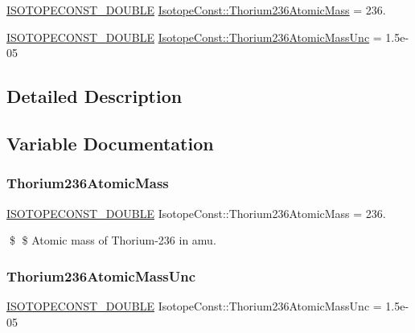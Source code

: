 \begin{DoxyCompactItemize}
\item 
\mbox{\hyperlink{group___isotope_const-_macros_ga8f45a7272ce02c0b4c65c44636ed719a}{I\+S\+O\+T\+O\+P\+E\+C\+O\+N\+S\+T\+\_\+\+D\+O\+U\+B\+LE}} \mbox{\hyperlink{group___isotope_const-_thorium-_th236_ga686ee07c3951e1dc96004a50714beb08}{Isotope\+Const\+::\+Thorium236\+Atomic\+Mass}} = 236.
\item 
\mbox{\hyperlink{group___isotope_const-_macros_ga8f45a7272ce02c0b4c65c44636ed719a}{I\+S\+O\+T\+O\+P\+E\+C\+O\+N\+S\+T\+\_\+\+D\+O\+U\+B\+LE}} \mbox{\hyperlink{group___isotope_const-_thorium-_th236_ga73688a759ff60291079861ae3b361071}{Isotope\+Const\+::\+Thorium236\+Atomic\+Mass\+Unc}} = 1.\+5e-\/05
\end{DoxyCompactItemize}


\subsection{Detailed Description}


\subsection{Variable Documentation}
\mbox{\label{group___isotope_const-_thorium-_th236_ga686ee07c3951e1dc96004a50714beb08}} 
\subsubsection{\texorpdfstring{Thorium236\+Atomic\+Mass}{Thorium236AtomicMass}}
{\footnotesize\ttfamily \mbox{\hyperlink{group___isotope_const-_macros_ga8f45a7272ce02c0b4c65c44636ed719a}{I\+S\+O\+T\+O\+P\+E\+C\+O\+N\+S\+T\+\_\+\+D\+O\+U\+B\+LE}} Isotope\+Const\+::\+Thorium236\+Atomic\+Mass = 236.}

\$ \$ Atomic mass of Thorium-\/236 in amu. \mbox{\label{group___isotope_const-_thorium-_th236_ga73688a759ff60291079861ae3b361071}} 
\subsubsection{\texorpdfstring{Thorium236\+Atomic\+Mass\+Unc}{Thorium236AtomicMassUnc}}
{\footnotesize\ttfamily \mbox{\hyperlink{group___isotope_const-_macros_ga8f45a7272ce02c0b4c65c44636ed719a}{I\+S\+O\+T\+O\+P\+E\+C\+O\+N\+S\+T\+\_\+\+D\+O\+U\+B\+LE}} Isotope\+Const\+::\+Thorium236\+Atomic\+Mass\+Unc = 1.\+5e-\/05}


